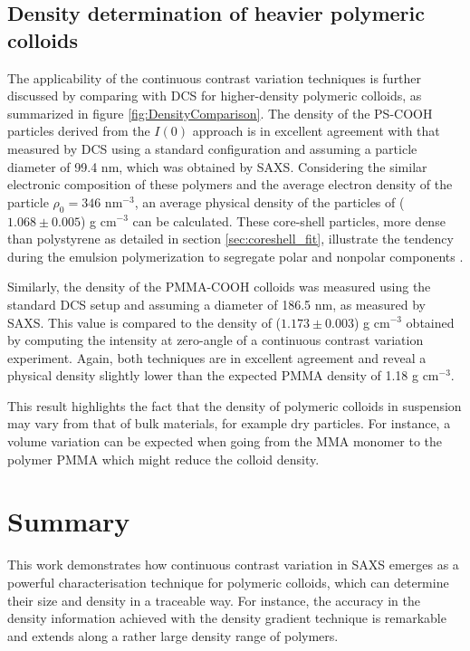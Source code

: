 \subsection{Density determination of heavier polymeric colloids}
The applicability of the continuous contrast variation techniques is further discussed by comparing with DCS for higher-density polymeric colloids, as summarized in figure \ref{fig:DensityComparison}. The density of the PS-COOH particles derived from the $I(0)$ approach is in excellent agreement with that measured by DCS using a standard configuration and assuming a particle diameter of 99.4 nm, which was obtained by SAXS. Considering the similar electronic composition of these polymers and the average electron density of the particle $\rho_0=346$ nm\(^{-3}\), an average physical density of the particles of ($1.068\pm0.005$) g cm$^{-3}$ can be calculated. These core-shell particles, more dense than polystyrene as detailed in section \ref{sec:coreshell_fit}, illustrate the tendency during the emulsion polymerization to segregate polar and nonpolar components \citep{dingenouts_structure_1994}.

Similarly, the density of the PMMA-COOH colloids was measured using the standard DCS setup and assuming a diameter of 186.5 nm, as measured by SAXS. This value is compared to the density of ($1.173\pm0.003$) g cm$^{-3}$ obtained by computing the intensity at zero-angle of a continuous contrast variation experiment. Again, both techniques are in excellent agreement and reveal a physical density slightly lower than the expected PMMA density of 1.18 g cm$^{-3}$\citep{dingenouts_analysis_1999}.

This result highlights the fact that the density of polymeric colloids in suspension may vary from that of bulk materials, for example dry particles. For instance, a volume variation can be expected when going from the MMA monomer to the polymer PMMA\citep{nichols_prediction_1950} which might reduce the colloid density.

\section{Summary}
This work demonstrates how continuous contrast variation in SAXS emerges as a powerful characterisation technique for polymeric colloids, which can determine their size and density in a traceable way. For instance, the accuracy in the density information achieved with the density gradient technique is remarkable and extends along a rather large density range of polymers.

